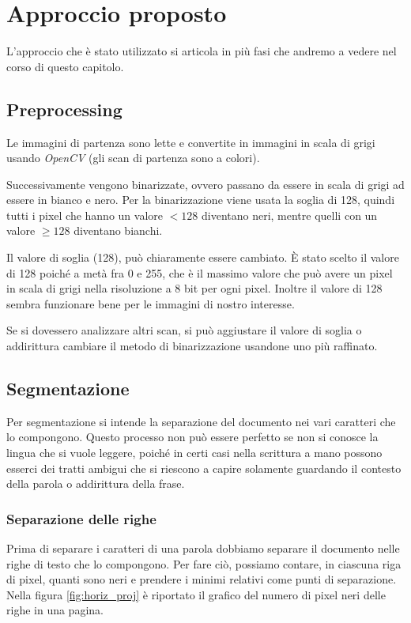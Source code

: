 \chapter{Approccio proposto}%

L'approccio che \`e stato utilizzato si articola in pi\`u fasi che andremo a vedere nel corso di questo capitolo.

\section{Preprocessing}

Le immagini di partenza sono lette e convertite in immagini in scala di grigi usando \emph{OpenCV} (gli scan di partenza sono a colori).

Successivamente vengono binarizzate, ovvero passano da essere in scala di grigi ad essere in bianco e nero. Per la binarizzazione viene usata la soglia di 128, quindi tutti i pixel che hanno un valore $<128$ diventano neri, mentre quelli con un valore $\ge128$ diventano bianchi.

Il valore di soglia (128), pu\`o chiaramente essere cambiato. \`E stato scelto il valore di 128 poich\'e a met\`a fra 0 e 255, che \`e il massimo valore che pu\`o avere un pixel in scala di grigi nella risoluzione a 8 bit per ogni pixel. Inoltre il valore di 128 sembra funzionare bene per le immagini di nostro interesse.

Se si dovessero analizzare altri scan, si pu\`o aggiustare il valore di soglia o addirittura cambiare il metodo di binarizzazione usandone uno pi\`u raffinato.

\section{Segmentazione}\label{sect:segmentation}

Per segmentazione si intende la separazione del documento nei vari caratteri che lo compongono. Questo processo non pu\`o essere perfetto se non si conosce la lingua che si vuole leggere, poich\'e in certi casi nella scrittura a mano possono esserci dei tratti ambigui che si riescono a capire solamente guardando il contesto della parola o addirittura della frase.

\subsection{Separazione delle righe}

Prima di separare i caratteri di una parola dobbiamo separare il documento nelle righe di testo che lo compongono. Per fare ci\`o, possiamo contare, in ciascuna riga di pixel, quanti sono neri e prendere i minimi relativi come punti di separazione. Nella figura \ref{fig:horiz_proj} \`e riportato il grafico del numero di pixel neri delle righe in una pagina.

